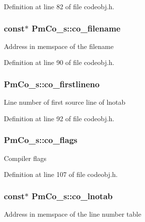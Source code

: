 Definition at line 82 of file codeobj.\-h.

\hypertarget{struct_pm_co__s_a2611e268836e77a080e64eaa5808a534}{
\subsubsection[{co\-\_\-filename}]{ {\bf const}$\ast$ Pm\-Co\-\_\-s\-::co\-\_\-filename}}\label{struct_pm_co__s_a2611e268836e77a080e64eaa5808a534}
Address in memspace of the filename 

Definition at line 90 of file codeobj.\-h.

\hypertarget{struct_pm_co__s_a6614b16095590b6880f28bbec2476176}{
\subsubsection[{co\-\_\-firstlineno}]{ Pm\-Co\-\_\-s\-::co\-\_\-firstlineno}}\label{struct_pm_co__s_a6614b16095590b6880f28bbec2476176}
Line number of first source line of lnotab 

Definition at line 92 of file codeobj.\-h.

\hypertarget{struct_pm_co__s_ae814f78d740cca9d253e46554d951b86}{
\subsubsection[{co\-\_\-flags}]{ Pm\-Co\-\_\-s\-::co\-\_\-flags}}\label{struct_pm_co__s_ae814f78d740cca9d253e46554d951b86}
Compiler flags 

Definition at line 107 of file codeobj.\-h.

\hypertarget{struct_pm_co__s_a9a888f95ac1bda8abbbbbfda5cbce9b8}{
\subsubsection[{co\-\_\-lnotab}]{ {\bf const}$\ast$ Pm\-Co\-\_\-s\-::co\-\_\-lnotab}}\label{struct_pm_co__s_a9a888f95ac1bda8abbbbbfda5cbce9b8}
Address in memspace of the line number table 

